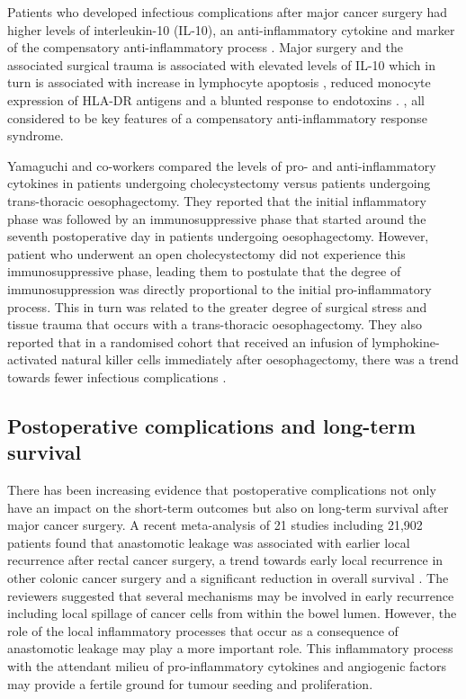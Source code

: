 Patients who developed infectious complications after major cancer surgery had higher levels of interleukin-10 (IL-10), an anti-inflammatory cytokine and marker of the compensatory anti-inflammatory process \parencite{mokart_early_2002}. 
Major surgery and the associated surgical trauma is associated with elevated levels of IL-10 which in turn is associated with increase in lymphocyte apoptosis \parencite{delogu_interleukin-10_2001}, reduced monocyte expression of HLA-DR antigens \parencite{klava_interleukin-10._1997} and a blunted response to endotoxins \parencite{ogata_role_2000, kawasaki_surgical_2001}. , all considered to be key features of a compensatory anti-inflammatory response syndrome. 

Yamaguchi and co-workers compared the levels of pro- and anti-inflammatory cytokines in patients undergoing cholecystectomy versus patients undergoing trans-thoracic oesophagectomy. 
They reported that the initial inflammatory phase was followed by an immunosuppressive phase that started around the seventh postoperative day in patients undergoing oesophagectomy. 
However, patient who underwent an open cholecystectomy did not experience this immunosuppressive phase, leading them to postulate that the degree of immunosuppression was directly proportional to the initial pro-inflammatory process. 
This in turn was related to the greater degree of surgical stress and tissue trauma that occurs with a trans-thoracic oesophagectomy. 
They also reported that in a randomised cohort that received an infusion of lymphokine-activated natural killer cells immediately after oesophagectomy, there was a trend towards fewer infectious complications \parencite{yamaguchi_postoperative_2006}. 

\subsection{Postoperative complications and long-term survival}
There has been increasing evidence that postoperative complications not only have an impact on the short-term outcomes but also on long-term survival after major cancer surgery. 
A recent meta-analysis of 21 studies including 21,902 patients found that anastomotic leakage was associated with earlier local recurrence after rectal cancer surgery, a trend towards early local recurrence in other colonic cancer surgery and a significant reduction in overall survival \parencite{mirnezami_increased_2011}. 
The reviewers suggested that several mechanisms may be involved in early recurrence including local spillage of cancer cells from within the bowel lumen. 
However, the role of the local inflammatory processes that occur as a consequence of anastomotic leakage may play a more important role. 
This inflammatory process with the attendant milieu of pro-inflammatory cytokines and angiogenic factors may provide a fertile ground for tumour seeding and proliferation.

